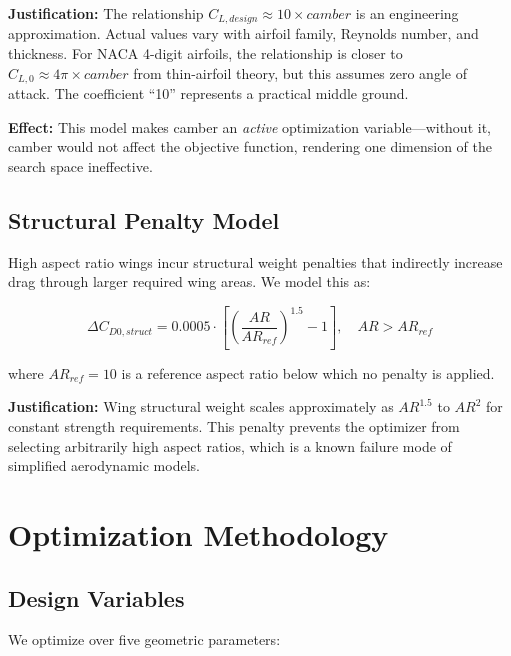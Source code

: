 \documentclass[11pt,a4paper]{article}
\begin{document}
\textbf{Justification:} The relationship $C_{L,design} \approx 10 \times camber$ is an engineering approximation. Actual values vary with airfoil family, Reynolds number, and thickness. For NACA 4-digit airfoils, the relationship is closer to $C_{L,0} \approx 4\pi \times camber$ from thin-airfoil theory, but this assumes zero angle of attack. The coefficient ``10'' represents a practical middle ground.

\textbf{Effect:} This model makes camber an \textit{active} optimization variable---without it, camber would not affect the objective function, rendering one dimension of the search space ineffective.

\subsection{Structural Penalty Model}

High aspect ratio wings incur structural weight penalties that indirectly increase drag through larger required wing areas. We model this as:

\begin{equation}
\Delta C_{D0,struct} = 0.0005 \cdot \left[\left(\frac{AR}{AR_{ref}}\right)^{1.5} - 1\right], \quad AR > AR_{ref}
\label{eq:struct_penalty}
\end{equation}

where $AR_{ref} = 10$ is a reference aspect ratio below which no penalty is applied.

\textbf{Justification:} Wing structural weight scales approximately as $AR^{1.5}$ to $AR^2$ for constant strength requirements. This penalty prevents the optimizer from selecting arbitrarily high aspect ratios, which is a known failure mode of simplified aerodynamic models.

\section{Optimization Methodology}

\subsection{Design Variables}

We optimize over five geometric parameters:
\end{document}

